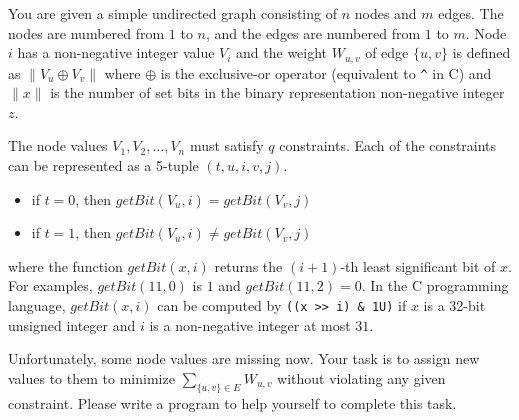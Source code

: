 You are given a simple undirected graph consisting of $n$ nodes and $m$ edges. 
The nodes are numbered from $1$ to $n$, 
and the edges are numbered from $1$ to $m$.
Node $i$ has a non-negative integer value $V_i$ and the weight $W_{u,v}$ of 
edge $\{u, v\}$ is defined as $\left\|V_u\oplus V_v\right\|$
where $\oplus$ is the exclusive-or operator (equivalent to \verb+^+ in C) and
$\|x\|$ is the number of set bits in the binary representation non-negative
integer $z$.

The node values $V_1,V_2,\dots,V_n$ must satisfy $q$ constraints.
Each of the constraints can be represented as 
a 5-tuple $(t,u,i,v,j)$.
\begin{itemize}
\item if $t = 0$, then $getBit(V_u, i) = getBit(V_v, j)$
\item if $t = 1$, then $getBit(V_u, i) \neq getBit(V_v, j)$
\end{itemize}
where the function $getBit(x, i)$ returns the $(i+1)$-th least significant
bit of $x$. For examples, $getBit(11, 0)$ is $1$ and $getBit(11,2)=0$. 
In the C programming language, $getBit(x, i)$ can be computed by 
\verb+((x >> i) & 1U)+ if $x$ is a 32-bit unsigned integer 
and $i$ is a non-negative integer at most $31$.

Unfortunately, some node values are missing now. 
Your task is to assign new values to them to minimize 
$\sum_{\{u,v\} \in E}W_{u,v}$ without violating any given constraint. 
Please write a program to help yourself to complete this task.
